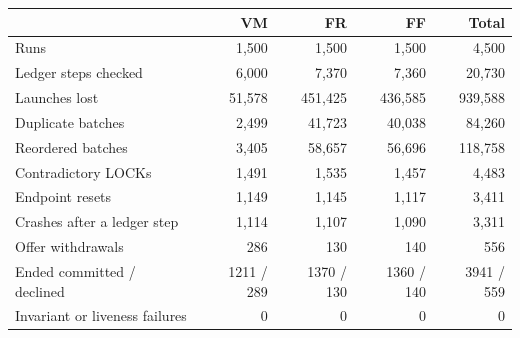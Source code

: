 \begin{tabular}{lrrrr}
\toprule
& VM & FR & FF & Total\\
\midrule
Runs & 1{,}500 & 1{,}500 & 1{,}500 & 4{,}500\\
Ledger steps checked & 6{,}000 & 7{,}370 & 7{,}360 & 20{,}730\\
Launches lost & 51{,}578 & 451{,}425 & 436{,}585 & 939{,}588\\
Duplicate batches & 2{,}499 & 41{,}723 & 40{,}038 & 84{,}260\\
Reordered batches & 3{,}405 & 58{,}657 & 56{,}696 & 118{,}758\\
Contradictory LOCKs & 1{,}491 & 1{,}535 & 1{,}457 & 4{,}483\\
Endpoint resets & 1{,}149 & 1{,}145 & 1{,}117 & 3{,}411\\
Crashes after a ledger step & 1{,}114 & 1{,}107 & 1{,}090 & 3{,}311\\
Offer withdrawals & 286 & 130 & 140 & 556\\
Ended committed / declined & 1211 / 289 & 1370 / 130 & 1360 / 140 & 3941 / 559\\
Invariant or liveness failures & 0 & 0 & 0 & 0\\
\bottomrule
\end{tabular}

